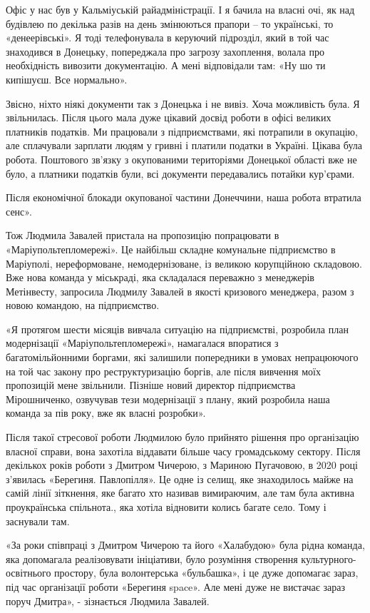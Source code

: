  Офіс у нас був у Кальміуській райадміністрації. І я бачила на власні очі, як
 над будівлею по декілька разів на день змінюються прапори – то українські, то
 «денеерівські». Я тоді телефонувала в керуючий  підрозділ, який в той час
 знаходився в Донецьку, попереджала про загрозу захоплення, волала про
 необхідність вивозити документацію. А мені відповідали там: «Ну шо ти
 кипішуєш. Все нормально». 

Звісно, ніхто ніякі документи так з Донецька і не вивіз. Хоча можливість була.
Я звільнилась. Після цього мала дуже цікавий досвід роботи в офісі великих
платників податків. Ми працювали з підприємствами, які потрапили в окупацію,
але сплачували зарплати людям у гривні і платили податки в Україні. Цікава була
робота. Поштового зв'язку з окупованими територіями Донецької області вже не
було, а платники податків були, всі документи передавались потайки кур'єрами. 

Після економічної блокади окупованої частини Донеччини, наша робота втратила
сенс».

Тож Людмила Завалей пристала на пропозицію попрацювати в
«Маріупольтепломережі». Це найбільш складне комунальне підприємство в
Маріуполі, нереформоване, немодернізоване, із великою корупційною складовою.
Вже нова команда у міськраді, яка складалася переважно з менеджерів Метінвесту,
запросила Людмилу Завалей в якості кризового менеджера, разом з новою командою,
на підприємство.

«Я протягом шести місяців вивчала ситуацію на підприємстві,  розробила план
модернізації «Маріупольтепломережі», намагалася впоратися з багатомільйонними
боргами, які залишили попередники в умовах непрацюючого на той час закону про
реструктуризацію боргів, але після вивчення моїх пропозицій мене звільнили.
Пізніше новий директор підприємства Мірошниченко, озвучував тези модернізації з
плану, який розробила наша команда за пів року, вже як власні розробки». 

Після такої стресової роботи Людмилою було прийнято рішення про організацію
власної справи, вона захотіла віддавати більше часу громадському сектору. Після
декількох років роботи з Дмитром Чичерою, з Мариною Пугачовою, в 2020 році
з'явилась «Берегиня. Павлопілля». Це одне із селищ, яке знаходилось майже на
самій лінії зіткнення, яке багато хто називав вимираючим, але там була активна
проукраїнська спільнота., яка хотіла відновити колись багате село. Тому і
заснували там.

«За роки співпраці з Дмитром Чичерою та його «Халабудою» була рідна команда,
яка допомагала реалізовувати ініціативи, було розуміння створення
культурного-освітнього простору, була волонтерська «бульбашка», і це дуже
допомагає зараз, під час організації роботи «Берегиня space». Але  мені дуже не
вистачає зараз поруч Дмитра», - зізнається Людмила Завалей.


